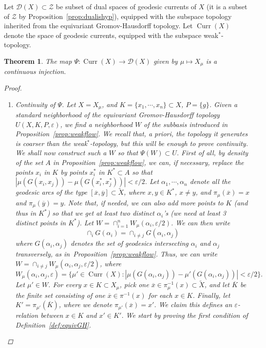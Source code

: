\documentclass[12pt,article]{amsart}
\numberwithin{equation}{section}
\numberwithin{figure}{section}
\newtheorem{theorem}[equation]{Theorem}
\theoremstyle{definition}
\theoremstyle{plain}
\DeclareMathOperator{\Curr}{Curr}
\newcommand*{\wt}[1]{\widetilde{#1}}
\renewcommand{\epsilon}{\varepsilon}
\begin{document}
Let $\mathcal{D}(X) \subset \mathcal{Z}$ be subset of dual spaces of geodesic currents of $X$ (it is a subset of $\mathcal{Z}$ by Proposition~\ref{prop:dualishyp}), equipped with the subspace topology inherited from the equivariant Gromov-Hausdorff topology.
Let $\Curr(X)$ denote the space of geodesic currents, equipped with the subspace weak$^*$-topology.

\begin{theorem}
\label{thm:homeo}
    The map $\Psi \colon \Curr(X) \to \mathcal{D}(X)$ given by $\mu \mapsto X_{\mu}$ is a continuous injection.
\begin{proof}
\begin{enumerate}
\item Continuity of $\Psi$. Let $X=X_{\mu}$, and $K = \{ x_1,\cdots,x_n \} \subset X$, $P=\{ g \}$. Given a standard neighborhood of the equivariant Gromov-Hausdorff topology  $U(X,K,P, \epsilon)$, we find a neighborhood $W$ of the subbasis introduced in Proposition~\ref{prop:weakflow}. We recall that, a priori, the topology it generates is coarser than the weak$^*$-topology, but this will be enough to prove continuity. We shall now construct such a $W$ so that $\Psi(W) \subset U$.
First of all, by density of the set $A$ in Proposition~\ref{prop:weakflow}, we can, if necessary, replace the points $x_i$ in $K$ by points $x_i^*$ in $K^* \subset A$ so that $|\mu(G(x_i,x_j))-\mu(G(x_i^*,x_j^*))| < \epsilon/2$.
Let $\alpha_1,\cdots,\alpha_n$ denote all the geodesic arcs of the type $[\overline{x},\overline{y}] \subset \wt{X}$, where $x, y \in K^*$, $x \neq y$, and $\pi_{\mu}(\overline{x})=x$ and $\pi_{\mu}(\overline{y})=y$.
Note that, if needed, we can also add more points to $K$ (and thus in $K^*$) so that we get at least two distinct $\alpha_i$'s (we need at least 3 distinct points in $K^*$).
Let $W = \cap_{i=1}^n W_{\mu}(\alpha_i,\epsilon/2)$. 
We can then write
\[
\cap_i G(\alpha_i)=\cap_{i \neq j} G(\alpha_i,\alpha_j)
\]
where $G(\alpha_i,\alpha_j)$ denotes the set of geodesics intersecting $\alpha_i$ and $\alpha_j$ transversely, as in~Proposition~\ref{prop:weakflow}. 
Thus, we can write
$W = \cap_{i \neq j} W_{\mu}(\alpha_i,\alpha_j,\epsilon/2)$, where
\[
W_{\mu}(\alpha_i, \alpha_j,\epsilon) = \{ \mu' \in \Curr(X) : |\mu(G(\alpha_i,\alpha_j))-\mu'(G(\alpha_i,\alpha_j))|<\epsilon/2 \}.
\]
Let $\mu' \in W$.
For every $x \in K \subset X_{\mu}$, pick one $\overline{x} \in \pi_{\mu}^{-1}(x) \subset \wt{X}$, and let $\overline{K}$ be the finite set consisting of one $\overline{x} \in \pi^{-1}(x)$ for each $x \in  K$.
Finally, let $K'=\pi_{\mu'}(\overline{K})$, where we denote $\pi_{\mu'}(\overline{x})=x'$.
We claim this defines an $\epsilon$-relation between $x \in K$ and $x' \in K'$.
 We start by proving the first condition of Definition~\ref{def:equivGH}.


\end{enumerate}
\end{proof}
\end{theorem}
\end{document}
